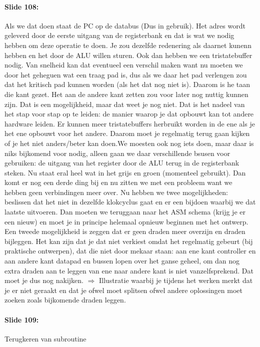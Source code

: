 \documentclass[10pt,a4paper]{book}
\begin{document}
\paragraph{Slide 108:} Als we dat doen staat de PC op de databus (Dus in gebruik). Het adres wordt geleverd door de eerste uitgang van de registerbank en dat is wat we nodig hebben om deze operatie te doen. Je zou dezelfde redenering als daarnet kunenn hebben en het door de ALU willen sturen. Ook dan hebben we een tristatebuffer nodig. Van snelheid kan dat eventueel een verschil maken want nu moeten we door het geheguen wat een traag pad is, dus als we daar het pad verlengen zou dat het kritisch pad kunnen worden (als het dat nog niet is). Daarom is he taan die kant gezet. Het aan de andere kant zetten zou voor later nog nuttig kunnen zijn. Dat is een mogelijkheid, maar dat weet je nog niet. Dat is het nadeel van het stap voor stap op te leiden: de manier waarop je dat opbouwt kan tot andere hardware leiden. Er kunnen meer tristatebuffers herbruikt worden in de ene als je het ene opbouwt voor het andere. Daarom moet je regelmatig terug gaan kijken of je het niet anders/beter kan doen.We moesten ook nog iets doen, maar daar is niks bijkomend voor nodig, alleen gaan we daar verschillende bsusen voor gebruiken: de uitgang van het register door de ALU terug in de registerbank steken. Nu staat eral heel wat in het grijs en groen (momenteel gebruikt). Dan komt er nog een derde ding bij en nu zitten we met een probleem want we hebben geen verbindingen meer over.  Nu hebben we twee mogelijkheden: beslissen dat het niet in dezelfde klokcyclus gaat en er een bijdoen waarbij we dat laatste uitvoeren. Dan moeten we teruggaan naar het ASM schema (krijg je er een nieuw) en moet je in principe helemaal opnieuw beginnen met het ontwerp. Een tweede mogelijkheid is zeggen dat er geen draden meer overzijn en draden bijleggen. Het kan zijn dat je dat niet verkiest omdat het regelmatig gebeurt (bij praktische ontwerpen), dat die niet door mekaar staan: aan ene kant controller en aan andere kant datapad en bussen lopen over het ganse geheel, om dan nog extra draden aan te leggen van ene naar andere kant is niet vanzelfsprekend. Dat moet je dus nog nakijken. $\Rightarrow$ Illustratie waarbij je tijdens het werken merkt dat je er niet geraakt en dat je ofwel moet splitsen ofwel andere oplossingen moet zoeken zoals bijkomende draden leggen.

\paragraph{Slide 109:} Terugkeren van subroutine
\end{document}
